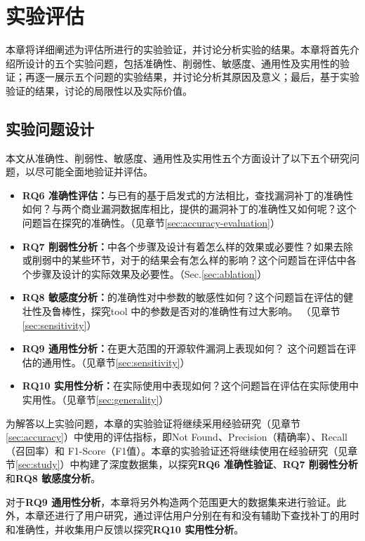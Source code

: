 \chapter{实验评估}

本章将详细阐述为评估\tool 所进行的实验验证，并讨论分析实验的结果。本章将首先介绍所设计的五个实验问题，包括准确性、削弱性、敏感度、通用性及实用性的验证；再逐一展示五个问题的实验结果，并讨论分析其原因及意义；最后，基于实验验证的结果，讨论\tool 的局限性以及实际价值。

\section{实验问题设计}
本文从准确性、削弱性、敏感度、通用性及实用性五个方面设计了以下五个研究问题，以尽可能全面地验证并评估\tool 。

\begin{itemize}[leftmargin=*]
\item \textbf{RQ6 准确性评估：}与已有的基于启发式的方法相比，\tool 查找漏洞补丁的准确性如何？与两个商业漏洞数据库相比，\tool 提供的漏洞补丁的准确性又如何呢？这个问题旨在探究\tool 的准确性。（见章节\ref{sec:accuracy-evaluation}）
\item \textbf{RQ7 削弱性分析：}\tool 中各个步骤及设计有着怎么样的效果或必要性？如果去除或削弱\tool 中的某些环节，对于\tool 的结果会有怎么样的影响？这个问题旨在评估\tool 中各个步骤及设计的实际效果及必要性。（Sec.\ref{sec:ablation}）
\item \textbf{RQ8 敏感度分析：}\tool 的准确性对\tool 中参数的敏感性如何？这个问题旨在评估\tool 的健壮性及鲁棒性，探究tool 中的参数是否对\tool 的准确性有过大影响。 （见章节\ref{sec:sensitivity}）
\item \textbf{RQ9 通用性分析：}\tool 在更大范围的开源软件漏洞上表现如何？ 这个问题旨在评估\tool 的通用性。（见章节\ref{sec:sensitivity}）
\item \textbf{RQ10 实用性分析：}\tool 在实际使用中表现如何？这个问题旨在评估\tool 在实际使用中实用性。（见章节\ref{sec:generality}）
\end{itemize}

为解答以上实验问题，本章的实验验证将继续采用经验研究（见章节\ref{sec:accuracy}）中使用的评估指标，即Not Found、Precision（精确率）、Recall（召回率）和 F1-Score（F1值）。本章的实验验证还将继续使用在经验研究（见章节\ref{sec:study}）中构建了深度数据集，以探究\textbf{RQ6 准确性验证}、\textbf{RQ7 削弱性分析}和\textbf{RQ8 敏感度分析}。

对于\textbf{RQ9 通用性分析}，本章将另外构造两个范围更大的数据集来进行验证。此外，本章还进行了用户研究，通过评估用户分别在有和没有\tool 辅助下查找补丁的用时和准确性，并收集用户反馈以探究\textbf{RQ10 实用性分析}。


